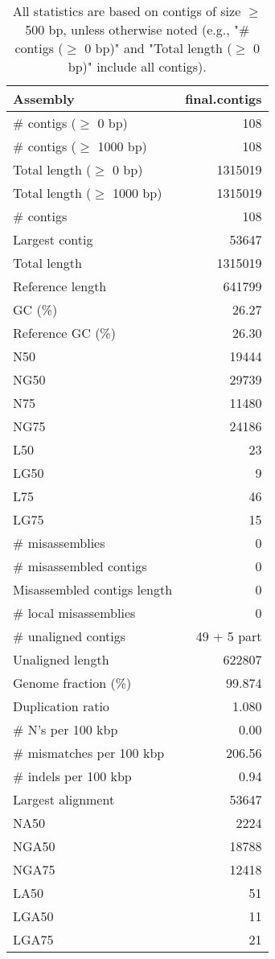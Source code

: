 \documentclass[12pt,a4paper]{article}
\begin{document}
\begin{table}[ht]
\begin{center}
\caption{All statistics are based on contigs of size $\geq$ 500 bp, unless otherwise noted (e.g., "\# contigs ($\geq$ 0 bp)" and "Total length ($\geq$ 0 bp)" include all contigs).}
\begin{tabular}{|l*{1}{|r}|}
\hline
Assembly & final.contigs \\ \hline
\# contigs ($\geq$ 0 bp) & 108 \\ \hline
\# contigs ($\geq$ 1000 bp) & 108 \\ \hline
Total length ($\geq$ 0 bp) & 1315019 \\ \hline
Total length ($\geq$ 1000 bp) & 1315019 \\ \hline
\# contigs & 108 \\ \hline
Largest contig & 53647 \\ \hline
Total length & 1315019 \\ \hline
Reference length & 641799 \\ \hline
GC (\%) & 26.27 \\ \hline
Reference GC (\%) & 26.30 \\ \hline
N50 & 19444 \\ \hline
NG50 & 29739 \\ \hline
N75 & 11480 \\ \hline
NG75 & 24186 \\ \hline
L50 & 23 \\ \hline
LG50 & 9 \\ \hline
L75 & 46 \\ \hline
LG75 & 15 \\ \hline
\# misassemblies & 0 \\ \hline
\# misassembled contigs & 0 \\ \hline
Misassembled contigs length & 0 \\ \hline
\# local misassemblies & 0 \\ \hline
\# unaligned contigs & 49 + 5 part \\ \hline
Unaligned length & 622807 \\ \hline
Genome fraction (\%) & 99.874 \\ \hline
Duplication ratio & 1.080 \\ \hline
\# N's per 100 kbp & 0.00 \\ \hline
\# mismatches per 100 kbp & 206.56 \\ \hline
\# indels per 100 kbp & 0.94 \\ \hline
Largest alignment & 53647 \\ \hline
NA50 & 2224 \\ \hline
NGA50 & 18788 \\ \hline
NGA75 & 12418 \\ \hline
LA50 & 51 \\ \hline
LGA50 & 11 \\ \hline
LGA75 & 21 \\ \hline
\end{tabular}
\end{center}
\end{table}
\end{document}
